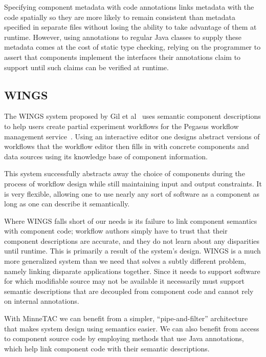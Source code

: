 \documentclass{article}
\begin{document}
Specifying component metadata with code annotations links metadata with the code spatially so they are more likely to remain consistent than metadata specified in separate files without losing the ability to take advantage of them at runtime.
However, using annotations to regular Java classes to supply these metadata comes at the cost of static type checking, relying on the programmer to assert that components implement the interfaces their annotations claim to support until such claims can be verified at runtime.


\subsection{WINGS}

The WINGS system proposed by Gil et al~\cite{gil2007wings} uses semantic component descriptions to help users create partial experiment workflows for the Pegasus workflow management service~\cite{callaghan2009scaling}.
Using an interactive editor one designs abstract versions of workflows that the workflow editor then fills in with concrete components and data sources using its knowledge base of component information.

This system successfully abstracts away the choice of components during the process of workflow design while still maintaining input and output constraints.
It is very flexible, allowing one to use nearly any sort of software as a component as long as one can describe it semantically.

Where WINGS falls short of our needs is its failure to link component semantics with component code; workflow authors simply have to trust that their component descriptions are accurate, and they do not learn about any disparities until runtime.
This is primarily a result of the system's design.
WINGS is a much more generalized system than we need that solves a subtly different problem, namely linking disparate applications together.
Since it needs to support software for which modifiable source may not be available it necessarily must support semantic descriptions that are decoupled from component code and cannot rely on internal annotations.

With MinneTAC we can benefit from a simpler, ``pipe-and-filter'' architecture that makes system design using semantics easier.
We can also benefit from access to component source code by employing methods that use Java annotations, which help link component code with their semantic descriptions.
\end{document}
